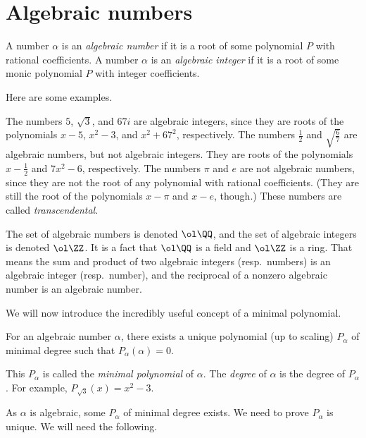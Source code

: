 \documentclass[11pt]{scrartcl}
\begin{document}
\section{Algebraic numbers}

\begin{definition}
	A number $\alpha$ is an \emph{algebraic number} if it is a root of
	some polynomial $P$ with rational coefficients.
	A number $\alpha$ is an \emph{algebraic integer} if it is a root of
	some monic polynomial $P$ with integer coefficients.
\end{definition}

Here are some examples.
\begin{itemize}
	\ii The numbers $5$, $\sqrt3$, and $67i$ are algebraic integers, since they are roots of the polynomials $x - 5$, $x^2 - 3$, and $x^2 + 67^2$, respectively.
	\ii The numbers $\frac12$ and $\sqrt{\frac 67}$ are algebraic numbers, but not algebraic integers. They are roots of the polynomials $x - \frac12$ and $7x^2 - 6$, respectively.
	\ii The numbers $\pi$ and $e$ are not algebraic numbers, since they are not the root of any polynomial with rational coefficients. (They are still the root of the polynomials $x - \pi$ and $x - e$, though.) These numbers are called \emph{transcendental}.
\end{itemize}

The set of algebraic numbers is denoted $\ol\QQ$,
and the set of algebraic integers is denoted $\ol\ZZ$.
It is a fact that $\ol\QQ$ is a field and $\ol\ZZ$ is a ring.
That means the sum and product of two algebraic integers (resp.\ numbers) is an algebraic integer (resp.\ number), and the reciprocal of a nonzero algebraic number is an algebraic number.

We will now introduce the incredibly useful concept of a minimal polynomial.

\begin{theorem}
	For an algebraic number $\alpha$, there exists a unique polynomial (up to scaling)
	$P_\alpha$ of minimal degree such that $P_\alpha(\alpha) = 0$.
\end{theorem}

This $P_\alpha$ is called the \emph{minimal polynomial} of $\alpha$.
The \emph{degree} of $\alpha$ is the degree of $P_\alpha$.
For example, $P_{\sqrt3}(x) = x^2 - 3$.

As $\alpha$ is algebraic, some $P_\alpha$ of minimal degree exists.
We need to prove $P_\alpha$ is unique. We will need the following.
\end{document}
